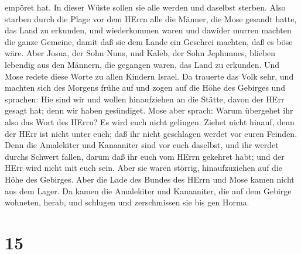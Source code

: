 empöret hat. In dieser Wüste sollen sie alle werden und daselbst
sterben.  Also starben durch die Plage vor dem HErrn alle
die Männer, die Mose gesandt hatte, das Land zu erkunden, und
wiederkommen waren und dawider murren machten die ganze Gemeine,
 damit daß sie dem Lande ein Geschrei machten, daß es böse
wäre.  Aber Josua, der Sohn Nuns, und Kaleb, der Sohn
Jephunnes, blieben lebendig aus den Männern, die gegangen waren, das
Land zu erkunden.  Und Mose redete diese Worte zu allen
Kindern Israel. Da trauerte das Volk sehr,  und machten
sich des Morgens frühe auf und zogen auf die Höhe des Gebirges und
sprachen: Hie sind wir und wollen hinaufziehen an die Stätte, davon der
HErr gesagt hat; denn wir haben gesündiget.  Mose aber
sprach: Warum übergehet ihr also das Wort des HErrn? Es wird euch nicht
gelingen.  Ziehet nicht hinauf, denn der HErr ist nicht
unter euch; daß ihr nicht geschlagen werdet vor euren Feinden.
 Denn die Amalekiter und Kanaaniter sind vor euch daselbst,
und ihr werdet durchs Schwert fallen, darum daß ihr euch vom HErrn
gekehret habt; und der HErr wird nicht mit euch sein.  Aber
sie waren störrig, hinaufzuziehen auf die Höhe des Gebirges. Aber die
Lade des Bundes des HErrn und Mose kamen nicht aus dem Lager.
 Da kamen die Amalekiter und Kanaaniter, die auf dem
Gebirge wohneten, herab, und schlugen und zerschmissen sie bis gen
Horma.

\hypertarget{section-14}{%
\section{15}\label{section-14}}

